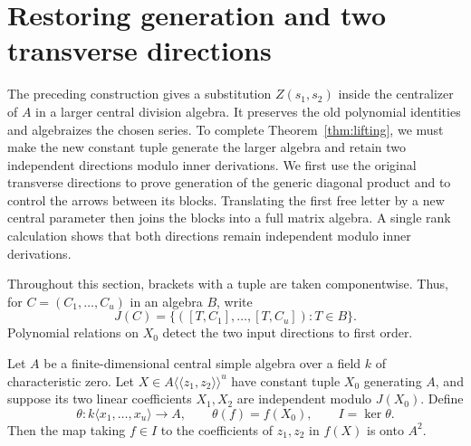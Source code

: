 \section{Restoring generation and two transverse directions}
\label{sec:generation}

The preceding construction gives a substitution $Z(s_1,s_2)$ inside
the centralizer of $A$ in a larger central division algebra.  It
preserves the old polynomial identities and algebraizes the chosen
series.  To complete Theorem~\ref{thm:lifting}, we must
make the new constant tuple generate the larger algebra and retain
two independent directions modulo inner derivations. We first use the
original transverse directions to prove generation of the generic
diagonal product and to control the arrows between its blocks.
Translating the first free letter by a new central parameter then joins
the blocks into a full matrix algebra. A single rank calculation shows
that both directions remain independent modulo inner derivations.

Throughout this section, brackets with a tuple are taken componentwise.
Thus, for $C=(C_1,\ldots,C_u)$ in an algebra $B$, write
\[
 J(C)=\{([T,C_1],\ldots,[T,C_u]):T\in B\}.
\]
Polynomial relations on $X_0$ detect the two input directions to first
order.

\begin{lemma}
\label{lem:derivatives-of-relations}
Let $A$ be a finite-dimensional central simple algebra over a field
$k$ of characteristic zero.  Let
$X\in A\langle\!\langle z_1,z_2\rangle\!\rangle^u$ have constant
tuple $X_0$ generating $A$, and suppose its two linear coefficients
$X_1,X_2$ are independent modulo $J(X_0)$.  Define
\[
 \theta:k\langle x_1,\ldots,x_u\rangle\longrightarrow A,
 \qquad \theta(f)=f(X_0),\qquad I=\ker\theta.
\]
Then the map taking $f\in I$ to the coefficients of $z_1,z_2$ in
$f(X)$ is onto $A^2$.
\end{lemma}

